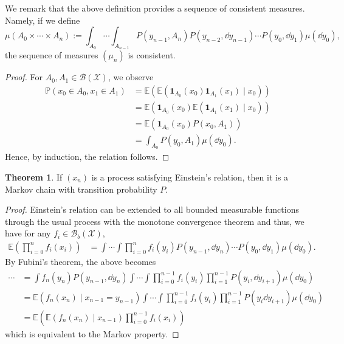 \documentclass[]{article}
\theoremstyle{definition}
\newtheorem{theorem}{Theorem}
\theoremstyle{definition}
\begin{document}
We remark that the above definition provides a sequence of consistent measures.
Namely, if we define 
\[\mu(A_0 \times \cdots \times A_n) := 
  \int_{A_0} \cdots \int_{A_{n - 1}} P(y_{n - 1}, A_n) P(y_{n - 2}, \dd y_{n - 1}) \cdots P(y_0, \dd y_1) \mu(\dd y_0),\]
the sequence of measures \((\mu_n)\) is consistent.
\begin{proof}
  For \(A_0, A_1 \in \mathcal{B}(\mathcal{X})\), we observe 
  \[\begin{split}
    \mathbb{P}(x_0 \in A_0, x_1 \in A_1) 
    & = \mathbb{E}(\mathbb{E}(\mathbf{1}_{A_0}(x_0) \mathbf{1}_{A_1}(x_1) \mid x_0)) \\
    & = \mathbb{E}(\mathbf{1}_{A_0}(x_0)\mathbb{E}(\mathbf{1}_{A_1}(x_1) \mid x_0)) \\
    & = \mathbb{E}(\mathbf{1}_{A_0}(x_0) P(x_0, A_1))\\
    & = \int_{A_0} P(y_0, A_1) \mu(\dd y_0).
  \end{split}\]
  Hence, by induction, the relation follows.
\end{proof}

\begin{theorem}
  If \((x_n)\) is a process satisfying Einstein's relation, then it is a 
  Markov chain with transition probability \(P\).
\end{theorem}
\begin{proof}
  Einstein's relation can be extended to all bounded measurable functions through 
  the usual process with the monotone convergence theorem and thus, we have 
  for any \(f_i \in \mathcal{B}_b(\mathcal{X})\), 
  \[\begin{split}
    \mathbb{E}\left(\prod_{i = 0}^n f_i(x_i)\right) 
    & = \int \cdots \int \prod_{i = 0}^n f_i(y_i) P(y_{n - 1}, \dd y_{n}) \cdots P(y_0, \dd y_1) \mu(\dd y_0).
  \end{split}\]
  By Fubini's theorem, the above becomes
  \[\begin{split}
    \cdots & = \int f_n(y_n)P(y_{n - 1}, \dd y_n)
      \int \cdots \int \prod_{i = 0}^{n - 1} f_i(y_i) \prod_{i = 1}^{n - 1} P(y_i, \dd y_{i + 1}) \mu(\dd y_0)\\
    & = \mathbb{E}(f_n(x_n) \mid x_{n - 1} = y_{n - 1}) 
      \int \cdots \int \prod_{i = 0}^{n - 1}f_i(y_i) \prod_{i = 1}^{n - 1} P(y_i \dd y_{i + 1}) \mu(\dd y_0)\\
    & = \mathbb{E}\left(\mathbb{E}(f_n(x_n) \mid x_{n - 1}) \prod_{i = 0}^{n - 1}f_i(x_i)\right)
  \end{split}\]
  which is equivalent to the Markov property.
\end{proof}
\end{document}

